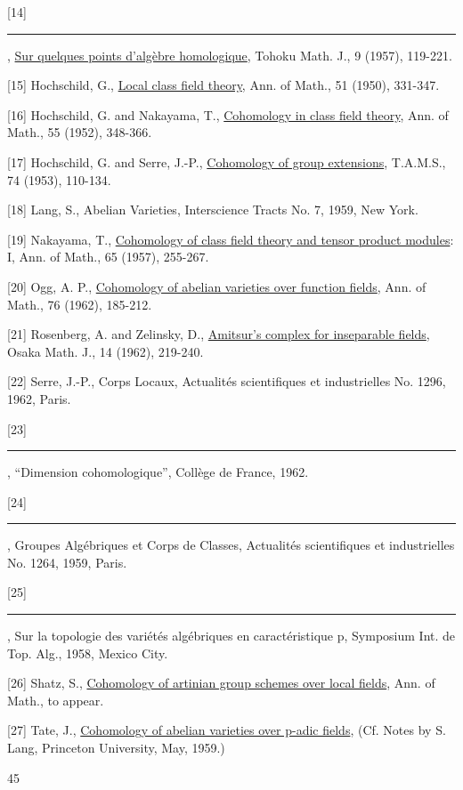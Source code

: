 [14] \rule{2cm}{0.4pt}, \uline{Sur quelques points d'algèbre homologique}, Tohoku Math. J., 9 (1957), 119-221.

[15] Hochschild, G., \uline{Local class field theory}, Ann. of Math., 51 (1950), 331-347.

[16] Hochschild, G. and Nakayama, T., \uline{Cohomology in class field theory}, Ann. of Math., 55 (1952), 348-366.

[17] Hochschild, G. and Serre, J.-P., \uline{Cohomology of group extensions}, T.A.M.S., 74 (1953), 110-134.

[18] Lang, S., Abelian Varieties, Interscience Tracts No. 7, 1959, New York.

[19] Nakayama, T., \uline{Cohomology of class field theory and tensor product modules}: I, Ann. of Math., 65 (1957), 255-267.

[20] Ogg, A. P., \uline{Cohomology of abelian varieties over function fields}, Ann. of Math., 76 (1962), 185-212.

[21] Rosenberg, A. and Zelinsky, D., \uline{Amitsur's complex for inseparable fields}, Osaka Math. J., 14 (1962), 219-240.

[22] Serre, J.-P., Corps Locaux, Actualités scientifiques et industrielles No. 1296, 1962, Paris.

[23] \rule{2cm}{0.4pt}, ``Dimension cohomologique'',  Collège de France, 1962.

[24] \rule{2cm}{0.4pt}, Groupes Algébriques et Corps de Classes, Actualités scientifiques et industrielles No. 1264, 1959, Paris.

[25] \rule{2cm}{0.4pt}, Sur la topologie des variétés algébriques en caractéristique p, Symposium Int. de Top. Alg., 1958, Mexico City.

[26] Shatz, S., \uline{Cohomology of artinian group schemes over local fields}, Ann. of Math., to appear.

[27] Tate, J., \uline{Cohomology of abelian varieties over p-adic fields}, (Cf. Notes by S. Lang, Princeton University, May, 1959.)

\begin{center}45\end{center}
